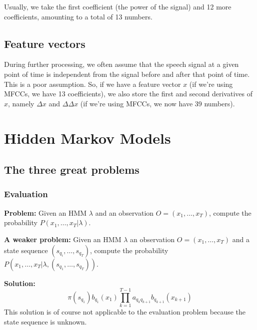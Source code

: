\documentclass[11pt]{article}
\begin{document}
Usually, we take the first coefficient (the power of the signal) and 12 more coefficients, amounting to a total of 13 numbers.

\subsection{Feature vectors}

During further processing, we often assume that the speech signal at a given point of time is independent from the signal before and after that point of time. This is a poor assumption. So, if we have a feature vector $x$ (if we're using MFCCs, we have 13 coefficients), we also store the first and second derivatives of $x$, namely $\Delta x$ and $\Delta \Delta x$ (if we're using MFCCs, we now have 39 numbers).

\section{Hidden Markov Models}

\subsection{The three great problems}

\subsubsection{Evaluation}

\textbf{Problem:} Given an HMM $\lambda$ and an observation $O = (x_1, \ldots, x_T)$, compute the probability $P(x_1, \ldots, x_T | \lambda)$.

\vspace{10pt}

\textbf{A weaker problem:} Given an HMM $\lambda$ an observation $O = (x_1, \ldots, x_T)$ and a state sequence $(s_{q_i}, \ldots, s_{q_T})$, compute the probability $P(x_1, \ldots, x_T | \lambda, (s_{q_1}, \ldots, s_{q_T}))$.

\vspace{5pt}

\textbf{Solution:}
\begin{equation}
    \pi(s_{q_1}) b_{q_1}(x_1) \prod\limits_{k = 1}^{T - 1} a_{q_{k}q_{k+1}} b_{q_{k+1}}(x_{k+1})
\end{equation}
This solution is of course not applicable to the evaluation problem because the state sequence is unknown.

\vspace{10pt}
\end{document}
